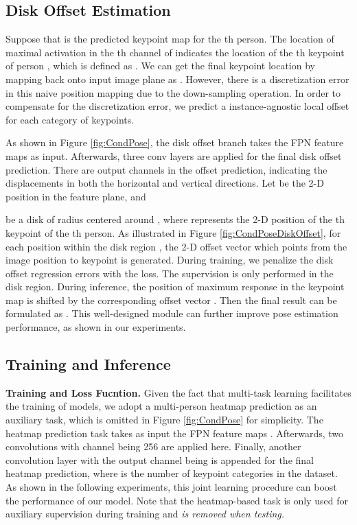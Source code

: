 \documentclass[sigconf]{acmart}
\begin{document}
\subsection{Disk Offset Estimation}
Suppose that  is the predicted keypoint map for the th person. 
The location of maximal activation in the th channel of  indicates the location of the th keypoint of person , 
which is defined as . 
We can get the final keypoint location by mapping back  onto input image plane as .
However, there is a discretization error in this naive position mapping due to the down-sampling operation.
In order to compensate for the discretization error, we predict a instance-agnostic local offset  for each category of keypoints.

As shown in Figure \ref{fig:CondPose}, the disk offset branch takes the FPN feature maps  as input.
Afterwards, three  conv layers are applied for the final disk offset prediction.
There are  output channels in the offset prediction, indicating the displacements in both the horizontal and vertical directions.
Let  be the 2-D position in the feature plane, and

be a disk of radius  centered around , where  represents the 2-D position of the th keypoint of the th person.
As illustrated in Figure \ref{fig:CondPoseDiskOffset}, for each position  within the disk region , the 2-D offset vector which points from the image position  to keypoint  is generated.
During training, we penalize the disk offset regression errors with the  loss.
The supervision is only performed in the disk region.
During inference, the position of maximum response  in the keypoint map is shifted by the corresponding offset vector .
Then the final result can be formulated as
.
This well-designed module can further improve pose estimation performance, as shown in our experiments.

\subsection{Training and Inference}

\textbf{Training and Loss Fucntion.}\quad
Given the fact that multi-task learning facilitates the training of models, we adopt a multi-person heatmap prediction as an auxiliary task, which is omitted in Figure \ref{fig:CondPose} for simplicity.
The heatmap prediction task takes as input the FPN feature maps . Afterwards, two  convolutions with channel being 256 are applied here. Finally, another  convolution layer with the output channel being  is appended for the final heatmap prediction, where  is the number of keypoint categories in the dataset. 
As shown in the following experiments, this joint learning procedure can boost the performance of our model. 
Note that the heatmap-based task is only used for auxiliary supervision during training and \textit{is removed when testing.}
\end{document}
